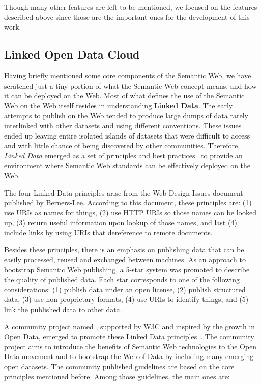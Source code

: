 Though many other \SPARQL{} features are left to be mentioned, we focused on the features described 
above since those are the important ones for the development of this work.

\subsection{Linked Open Data Cloud}
\label{cap2:semWeb/linkedData}
Having briefly mentioned some core components of the Semantic Web, we have scratched just a tiny 
portion of what the Semantic Web concept means, and how it can be deployed on the Web. Most of 
what defines the use of the Semantic Web on the Web itself resides in understanding 
\textbf{Linked Data}. The early attempts to publish \RDF{} on the Web tended to produce large dumps 
of data rarely interlinked with other \RDF{} datasets and using different conventions. These issues 
ended up leaving entire isolated islands of \RDF{} datasets that were difficult to access and with 
little chance of being discovered by other communities. Therefore, \textit{Linked Data} emerged as 
a set of principles and best practices~\cite{key:ldprinciples} to provide an environment where 
Semantic Web standards can be effectively deployed on the Web.

The four Linked Data principles arise from the Web Design Issues document published by 
Berners-Lee\cite{key:ldprinciples}. According to this document, these principles are: (1) use URIs 
as names for things, (2) use HTTP URIs so those names can be looked up, (3) return useful 
information upon lookup of those names, and last (4) include links by using URIs that dereference 
to remote documents. 

Besides these principles, there is an emphasis on publishing data that can be easily processed, 
reused and exchanged between machines. As an approach to bootstrap Semantic Web publishing, 
a 5-star system\cite{key:ldprinciples} was promoted to describe the quality of published \RDF{} data. 
Each star corresponds to one of the following considerations: (1) publish data under an open license, 
(2) publish structured data, (3) use non-proprietary formats, (4) use URIs to identify things, and 
(5) link the published data to other data.

A community project named , supported by W3C and inspired by the growth 
in Open Data, emerged to promote these Linked Data principles~\cite{key:ldbook}. The community 
project aims to introduce the benefits of Semantic Web technologies to the Open Data movement and 
to bootstrap the Web of Data by including many emerging open datasets. The community published 
guidelines are based on the core principles mentioned before. Among those guidelines, the main 
ones are:

